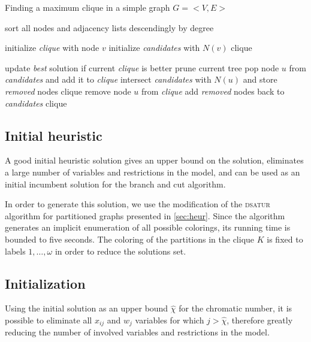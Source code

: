 \begin{algorithm}
\caption{Finding a maximum clique in a simple graph $G=<V,E>$}
\label{alg:gpclique}

\begin{algorithmic}

\STATE sort all nodes and adjacency lists descendingly by degree

	\STATE initialize \textit{clique} with node $v$
	\STATE initialize \textit{candidates} with $N(v)$
	\CALL clique 
\ENDFOR

		\STATE update \textit{best} solution if current \textit{clique} is better
		\STATE prune current tree
	\ELSE
		\STATE pop node $u$ from \textit{candidates} and add it to \textit{clique}
		\STATE intersect \textit{candidates} with $N(u)$ and store \textit{removed} nodes
		\CALL clique
		\STATE remove node $u$ from \textit{clique}
		\STATE add \textit{removed} nodes back to \textit{candidates} 
		\CALL clique
	\ENDIF
\ENDPROC

\end{algorithmic}
\end{algorithm} 

\subsection{Initial heuristic}

A good initial heuristic solution gives an upper bound on the solution, eliminates a large number of variables and restrictions in the model, and can be used as an initial incumbent solution for the branch and cut algorithm. 

In order to generate this solution, we use the modification of the \textsc{dsatur} algorithm for partitioned graphs presented in \ref{sec:heur}. Since the algorithm generates an implicit enumeration of all possible colorings, its running time is bounded to five seconds. The coloring of the partitions in the clique $K$ is fixed to labels $1, \ldots, \omega$ in order to reduce the solutions set.

\subsection{Initialization}

Using the initial solution as an upper bound $\hat{\chi}$ for the chromatic number, it is possible to eliminate all $x_{ij}$ and $w_j$ variables for which  $j > \hat{\chi}$, therefore greatly reducing the number of involved variables and restrictions in the model.

